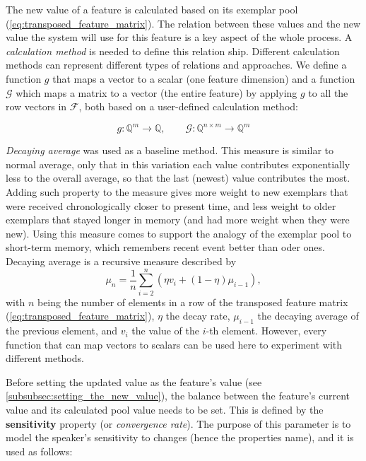 The new value of a feature is calculated based on its exemplar pool (\cref{eq:transposed_feature_matrix}).
The relation between these values and the new value the system will use for this feature is a key aspect of the whole process.
A \textit{calculation method} is needed to define this relation ship.
Different calculation methods can represent different types of relations and approaches.
We define a function $g$ that maps a vector to a scalar (one feature dimension) and a function $\mathcal{G}$ which maps a matrix to a vector (the entire feature) by applying $g$ to all the row vectors in $\mathcal{F}$, both based on a user-defined calculation method:

\begin{equation}
	\label{eq:matrix2vec}
	g: \mathbb{Q}^{m} \longrightarrow \mathbb{Q}, \qquad \mathcal{G}: \mathbb{Q}^{n \times m} \longrightarrow \mathbb{Q}^{m} 
\end{equation}

\textit{Decaying average} was used as a baseline method.
This measure is similar to normal average, only that in this variation each value contributes exponentially less to the overall average, so that the last (newest) value contributes the most.
Adding such property to the measure gives more weight to new exemplars that were received chronologically closer to present time, and less weight to older exemplars that stayed longer in memory (and had more weight when they were new).
Using this measure comes to support the analogy of the exemplar pool to short-term memory, which remembers recent event better than oder ones.
Decaying average is a recursive measure described by
\begin{equation}
\label{eq:decaying_average}
\mu_n = \frac{1}{n}\sum_{i = 2}^{n}(\eta v_i + (1 - \eta )\mu_{i-1}),
\end{equation}
%
with $n$ being the number of elements in a row of the transposed feature matrix (\cref{eq:transposed_feature_matrix}), $\eta$ the decay rate, $\mu_{i-1}$ the decaying average of the previous element, and $v_i$ the value of the $i$-th element.
However, every function that can map vectors to scalars can be used here to experiment with different methods.

Before setting the updated value as the feature's value (see \cref{subsubsec:setting_the_new_value}), the balance between the feature's current value and its calculated pool value needs to be set.
This is defined by the \textbf{sensitivity} property (or \textit{convergence rate}).
The purpose of this parameter is to model the speaker's sensitivity to changes (hence the properties name), and it is used as follows:

